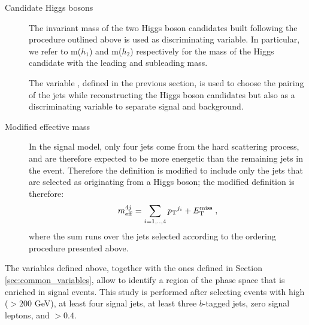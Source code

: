 \begin{description}
\item[Candidate Higgs bosons] The invariant mass of the two Higgs boson candidates built following the procedure outlined above 
is used as discriminating variable. In particular, we refer to m($h_1$) and m($h_2$) respectively for the mass of the Higgs candidate with 
the leading and subleading mass.

The variable \dRmax, defined in the previous section, is used to choose the pairing of the jets while reconstructing 
the Higgs boson candidates but also as a discriminating variable to separate signal and background. 

\item[Modified effective mass] In the signal model, only four jets come from the hard scattering process, and are therefore expected to be more energetic than the 
remaining jets in the event. Therefore the \meff definition is modified to include only the jets that are selected 
as originating from a Higgs boson; the modified definition is therefore:
\begin{equation}
m_{\mathrm{eff}}^{4j} = \sum_{i=1,..,4} {p_{\rm T}}^{j_i} + E_{\rm T}^{\mathrm{miss}} \; , \nonumber
\end{equation}
\noindent where the sum runs over the jets selected according to the ordering procedure presented above.

\end{description}

The variables defined above, together with the ones defined in Section \ref{sec:common_variables},  
allow to identify a region of the phase space that is enriched in signal events. 
This study is performed after selecting events with high \met ($> 200$ GeV), at least four signal jets, at least three $b$-tagged jets, zero signal leptons, and \dphimin $>0.4$.

